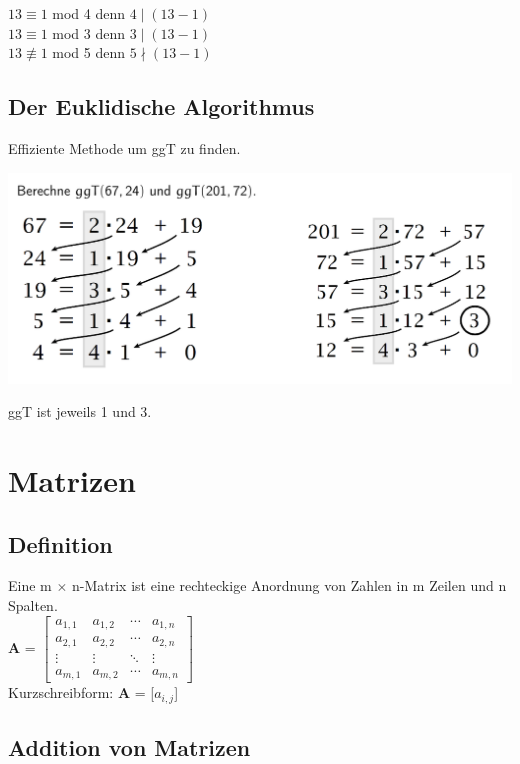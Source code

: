 \documentclass[12pt]{scrartcl}
\begin{document}
$13 \equiv 1$ mod 4 denn $4 \mid (13 - 1)$\\
$13 \equiv 1$ mod 3 denn $3 \mid (13 - 1)$\\
$13 \not\equiv  1$ mod 5 denn $5 \nmid (13 - 1)$\\


\newpage
\subsection{Der Euklidische Algorithmus}
Effiziente Methode um ggT zu finden.

\includegraphics[width=15cm]{img/euqlidic_algorithm.png}

ggT ist jeweils 1 und 3.

\section{Matrizen}
\subsection{Definition}
Eine m $\times$ n-Matrix ist eine rechteckige Anordnung von Zahlen in m Zeilen und n
Spalten.\\

\renewcommand{\arraystretch}{1}
\textbf{A} = 
$
\begin{bmatrix}
    a_{1,1} & a_{1,2} & \cdots & a_{1,n}\\
    a_{2,1} & a_{2,2} & \cdots & a_{2,n}\\
    \vdots & \vdots & \ddots & \vdots\\
    a_{m,1} & a_{m,2} & \cdots & a_{m,n}
\end{bmatrix}$\\


Kurzschreibform: \textbf{A} = [$a_{i,j}$]


\subsection{Addition von Matrizen}
\end{document}
